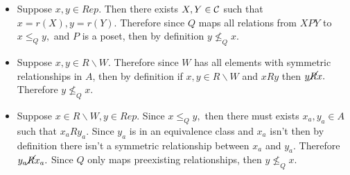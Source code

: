 \documentclass[12pt, letterpaper]{article}
\begin{document}
\begin{itemize}
\begin{itemize}
		\begin{itemize}
			\item Suppose $x, y \in Rep.$  Then there exists $X,Y \in \cal C$ such that $x = r(X), y = r(Y).$  Therefore since $Q$ maps all relations from $XPY$ to $x \leq_Q y,$ and $P$ is a poset, then by definition $y \nleq_Q x.$
			\item Suppose $x,y \in R \backslash W.$  Therefore since $W$ has all elements with  symmetric relationships in $A$, then by definition if $x,y \in R \backslash W$ and $x R y$ then $y \cancel{R} x.$  Therefore $y \nleq_Q x.$
			\item Suppose $x \in R \backslash W, y \in Rep.$  Since $x \leq_Q y,$ then there must exists $x_a, y_a \in A$ such that $x_a R y_a.$  Since $y_a$ is in an equivalence class and $x_a$ isn't then by definition there isn't a symmetric relationship between $x_a$ and $y_a.$  Therefore $y_a \cancel{R} x_a.$  Since $Q$ only maps preexisting relationships, then $y \nleq_Q x.$ 
		\end{itemize}
	\end{itemize}


\end{itemize}
\end{document}
